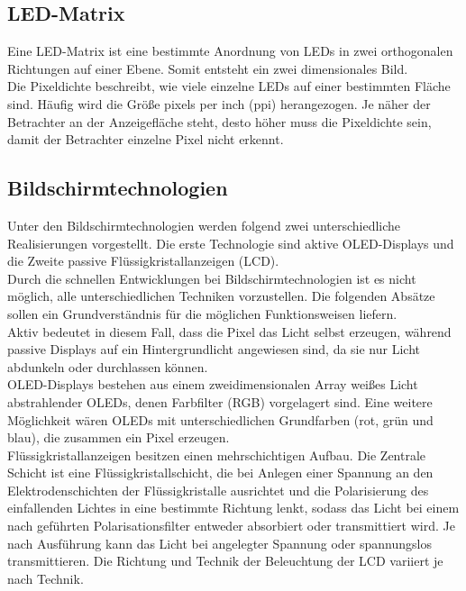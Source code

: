 \subsection{LED-Matrix}
Eine LED-Matrix ist eine bestimmte Anordnung von LEDs in zwei orthogonalen Richtungen auf einer Ebene. Somit entsteht ein zwei dimensionales Bild.\\ 
Die Pixeldichte beschreibt, wie viele einzelne LEDs auf einer bestimmten Fläche sind. Häufig wird die Größe \glqq pixels per inch\grqq{} (ppi) herangezogen. Je näher der Betrachter an der Anzeigefläche steht, desto höher muss die Pixeldichte sein, damit der Betrachter einzelne Pixel nicht erkennt.
\subsection{Bildschirmtechnologien}
Unter den Bildschirmtechnologien werden folgend zwei unterschiedliche Realisierungen vorgestellt. Die erste Technologie sind aktive OLED-Displays und die Zweite passive Flüssigkristallanzeigen (LCD). \\
Durch die schnellen Entwicklungen bei Bildschirmtechnologien ist es nicht möglich, alle unterschiedlichen Techniken vorzustellen. Die folgenden Absätze sollen ein Grundverständnis für die möglichen Funktionsweisen liefern.\\
Aktiv bedeutet in diesem Fall, dass die Pixel das Licht selbst erzeugen, während passive Displays auf ein Hintergrundlicht angewiesen sind, da sie nur Licht abdunkeln oder durchlassen können. \\
\glqq OLED-Displays bestehen aus einem zweidimensionalen Array weißes Licht abstrahlender OLEDs, denen Farbfilter (RGB) vorgelagert sind.\grqq \cite[Seite 347]{LofflerMang.2020} Eine weitere Möglichkeit wären OLEDs mit unterschiedlichen Grundfarben (rot, grün und blau), die zusammen ein Pixel erzeugen. \\
Flüssigkristallanzeigen besitzen einen mehrschichtigen Aufbau. Die Zentrale Schicht ist eine Flüssigkristallschicht, die bei Anlegen einer Spannung an den Elektrodenschichten der Flüssigkristalle ausrichtet und die Polarisierung des einfallenden Lichtes in eine bestimmte Richtung lenkt, sodass das Licht bei einem nach geführten Polarisationsfilter entweder absorbiert oder transmittiert wird. \cite[][Vgl. Seite 346 f.]{LofflerMang.2020} Je nach Ausführung kann das Licht bei angelegter Spannung oder spannungslos transmittieren. Die Richtung und Technik der Beleuchtung der LCD variiert je nach Technik.
